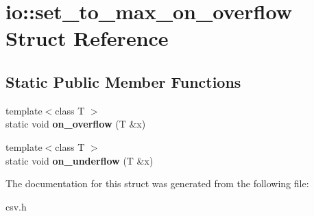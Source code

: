 \section{io\+:\+:set\+\_\+to\+\_\+max\+\_\+on\+\_\+overflow Struct Reference}
\label{structio_1_1set__to__max__on__overflow}
\subsection*{Static Public Member Functions}
\begin{DoxyCompactItemize}
\item 
{\footnotesize template$<$class T $>$ }\\static void {\bfseries on\+\_\+overflow} (T \&x)\label{structio_1_1set__to__max__on__overflow_a770dee97a1ee55131163e6be8d4c0d9d}

\item 
{\footnotesize template$<$class T $>$ }\\static void {\bfseries on\+\_\+underflow} (T \&x)\label{structio_1_1set__to__max__on__overflow_a812d316e2b23247df19ca83bfda90a59}

\end{DoxyCompactItemize}


The documentation for this struct was generated from the following file\+:\begin{DoxyCompactItemize}
\item 
csv.\+h\end{DoxyCompactItemize}
